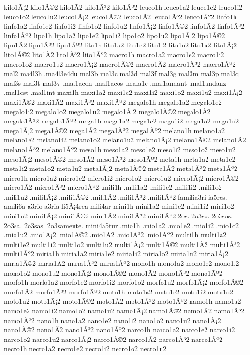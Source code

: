 {kilo1Ã¡2 kilo1Ã©2 kilo1Ã­2 kilo1Ã³2 kilo1Ãº2
leuco1h
leuco1a2 leuco1e2 leuco1i2 leuco1o2 leuco1u2
leuco1Ã¡2 leuco1Ã©2 leuco1Ã­2 leuco1Ã³2 leuco1Ãº2
linfo1h
linfo1a2 linfo1e2 linfo1i2 linfo1o2 linfo1u2
linfo1Ã¡2 linfo1Ã©2 linfo1Ã­2 linfo1Ã³2 linfo1Ãº2
lipo1h
lipo1a2 lipo1e2 lipo1i2 lipo1o2 lipo1u2
lipo1Ã¡2 lipo1Ã©2 lipo1Ã­2 lipo1Ã³2 lipo1Ãº2
lito1h
lito1a2 lito1e2 lito1i2 lito1o2 lito1u2
lito1Ã¡2 lito1Ã©2 lito1Ã­2 lito1Ã³2 lito1Ãº2
macro1h
macro1a2 macro1e2 macro1i2 macro1o2 macro1u2
macro1Ã¡2 macro1Ã©2 macro1Ã­2 macro1Ã³2 macro1Ãº2
mal2
ma4l3h
.ma4l3e4du
mal3b
mal3c
mal3d
mal3f
mal3g
mal3m
mal3p
mal3q
mal3s
mal3t
mal3v
.mal1acon
.mal1acos
.mala1e
.mal1andant
.mal1andanz
.mal1est
.mal1int
maxi1h
maxi1a2 maxi1e2 maxi1i2 maxi1o2 maxi1u2
maxi1Ã¡2 maxi1Ã©2 maxi1Ã­2 maxi1Ã³2 maxi1Ãº2
megalo1h
megalo1a2 megalo1e2 megalo1i2 megalo1o2 megalo1u2
megalo1Ã¡2 megalo1Ã©2 megalo1Ã­2 megalo1Ã³2 megalo1Ãº2
mega1h
mega1a2 mega1e2 mega1i2 mega1o2 mega1u2
mega1Ã¡2 mega1Ã©2 mega1Ã­2 mega1Ã³2 mega1Ãº2
melano1h
melano1a2 melano1e2 melano1i2 melano1o2 melano1u2
melano1Ã¡2 melano1Ã©2 melano1Ã­2 melano1Ã³2 melano1Ãº2
meso1h
meso1a2 meso1e2 meso1i2 meso1o2 meso1u2
meso1Ã¡2 meso1Ã©2 meso1Ã­2 meso1Ã³2 meso1Ãº2
meta1h
meta1a2 meta1e2 meta1i2 meta1o2 meta1u2
meta1Ã¡2 meta1Ã©2 meta1Ã­2 meta1Ã³2 meta1Ãº2
micro1h
micro1a2 micro1e2 micro1i2 micro1o2 micro1u2
micro1Ã¡2 micro1Ã©2 micro1Ã­2 micro1Ã³2 micro1Ãº2
.mili1h
.mili1a2 .mili1e2 .mili1i2 .mili1o2 .mili1u2
.mili1Ã¡2 .mili1Ã©2 .mili1Ã­2 .mili1Ã³2 .mili1Ãº2
familia3ri
ia5res.
amili6a
a3rio
a3ria
li5Ã¡4rea
mili4ar
mini1h
mini1a2 mini1e2 mini1i2 mini1o2 mini1u2
mini1Ã¡2 mini1Ã©2 mini1Ã­2 mini1Ã³2 mini1Ãº2
2os.
2o3so.
2o3sos.
2o3sa.
2o3sas.
2o3samente.
mini4a5tur
.mio1h
.mio1a2 .mio1e2 .mio1i2 .mio1o2 .mio1u2
.mio1Ã¡2 .mio1Ã©2 .mio1Ã­2 .mio1Ã³2 .mio1Ãº2
multi1h
multi1a2 multi1e2 multi1i2 multi1o2 multi1u2
multi1Ã¡2 multi1Ã©2 multi1Ã­2 multi1Ã³2 multi1Ãº2
miria1h
miria1a2 miria1e2 miria1i2 miria1o2 miria1u2
miria1Ã¡2 miria1Ã©2 miria1Ã­2 miria1Ã³2 miria1Ãº2
mono1h
mono1a2 mono1e2 mono1i2 mono1o2 mono1u2
mono1Ã¡2 mono1Ã©2 mono1Ã­2 mono1Ã³2 mono1Ãº2
morfo1h
morfo1a2 morfo1e2 morfo1i2 morfo1o2 morfo1u2
morfo1Ã¡2 morfo1Ã©2 morfo1Ã­2 morfo1Ã³2 morfo1Ãº2
moto1h
moto1a2 moto1e2 moto1i2 moto1o2 moto1u2
moto1Ã¡2 moto1Ã©2 moto1Ã­2 moto1Ã³2 moto1Ãº2
namo1h
namo1a2 namo1e2 namo1i2 namo1o2 namo1u2
namo1Ã¡2 namo1Ã©2 namo1Ã­2 namo1Ã³2 namo1Ãº2
nano1h
nano1a2 nano1e2 nano1i2 nano1o2 nano1u2
nano1Ã¡2 nano1Ã©2 nano1Ã­2 nano1Ã³2 nano1Ãº2
narco1h
narco1a2 narco1e2 narco1i2 narco1o2 narco1u2
narco1Ã¡2 narco1Ã©2 narco1Ã­2 narco1Ã³2 narco1Ãº2
necro1h
necro1a2 necro1e2 necro1i2 necro1o2 necro1u2
}
